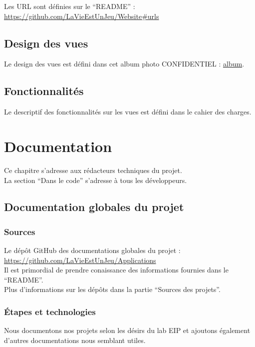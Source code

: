 \documentclass{life-fr}
\begin{document}
Les URL sont définies sur le ``README'' :
\url{https://github.com/LaVieEstUnJeu/Website#urls}

\section{Design des vues}

Le design des vues est défini dans cet album photo CONFIDENTIEL :
\href{http://photos.db0.fr/?album=GLifeDesign?authkey=Gv1sRgCLmfvp7DmMK_hAE}{album}.

\section{Fonctionnalités}

Le descriptif des fonctionnalités sur les vues est défini dans le cahier
des charges.


\chapter{Documentation}

Ce chapitre s'adresse aux rédacteurs techniques du projet.\\
La section ``Dans le code'' s'adresse à tous les développeurs.

\section{Documentation globales du projet}

\subsection{Sources}

Le dépôt GitHub des documentations globales du projet :
\url{https://github.com/LaVieEstUnJeu/Applications}\\
Il est primordial de prendre conaissance des informations fournies dans le
``README''.\\
Plus d'informations sur les dépôts dans la partie ``Sources des projets''.

\subsection{Étapes et technologies}

Nous documentons nos projets selon les désirs du lab EIP et ajoutons
également d'autres documentations nous semblant utiles.
\end{document}
